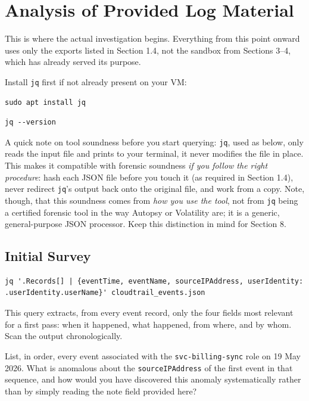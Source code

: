 \section{Analysis of Provided Log Material}
\label{sec:log-analysis}

This is where the actual investigation begins. Everything from this point onward uses only the
exports listed in Section 1.4, not the sandbox from Sections 3--4, which has already served
its purpose.
\medskip

\noindent
Install \texttt{jq} first if not already present on your VM:
\begin{lstlisting}
sudo apt install jq
\end{lstlisting}
\begin{lstlisting}
jq --version
\end{lstlisting}

\begin{warningbox}
A quick note on tool soundness before you start querying: \texttt{jq}, used as below, only reads
the input file and prints to your terminal, it never modifies the file in place. \\
This makes it compatible with forensic soundness \emph{if you follow the right procedure}: hash each JSON file
before you touch it (as required in Section 1.4), never redirect \texttt{jq}'s output back onto the original file, and work from a copy. Note, though, that this soundness comes from \emph{how you use the tool}, not from \texttt{jq} being a certified forensic tool in the way Autopsy or Volatility are; it is a generic, general-purpose JSON processor. Keep this distinction in mind for Section 8.
\end{warningbox}

\subsection{Initial Survey}

\begin{lstlisting}
jq '.Records[] | {eventTime, eventName, sourceIPAddress, userIdentity: .userIdentity.userName}' cloudtrail_events.json
\end{lstlisting}
This query extracts, from every event record, only the four fields most relevant for a first
pass: when it happened, what happened, from where, and by whom. Scan the output chronologically.

\begin{questionbox}
List, in order, every event associated with the \texttt{svc-billing-sync} role on 19 May 2026.
What is anomalous about the \texttt{sourceIPAddress} of the first event in that sequence, and
how would you have discovered this anomaly systematically rather than by simply reading the
note field provided here?
\end{questionbox}


